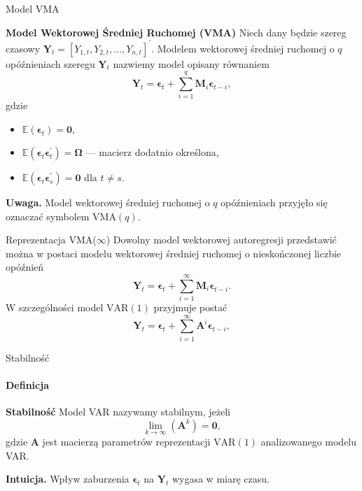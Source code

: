 \documentclass[a4paper, 11pt]{beamer}
\begin{document}
	\begin{frame}{Model VMA}
		\begin{block}{\textbf{Model Wektorowej Średniej Ruchomej (VMA)}}
			Niech dany będzie szereg czasowy $\boldsymbol{Y}_{t} = 
			\left[Y_{1,t}, Y_{2,t}, \ldots, Y_{n,t}\right]^{\prime}.$ 
			Modelem wektorowej średniej ruchomej o $q$ opóźnieniach szeregu 
			$\boldsymbol{Y}_{t}$ nazwiemy model opisany równaniem
			\[
				\boldsymbol{Y}_{t} =
					\boldsymbol{\epsilon}_{t} + 
					\sum_{i=1}^{q}
						\boldsymbol{M}_{i} \boldsymbol{\epsilon}_{t-i},
			\]
			gdzie
			\begin{itemize}
				\item $\mathbb{E}\left(\boldsymbol{\epsilon}_{t}\right) = 
					\boldsymbol{0},$
				\item $\mathbb{E}\left(
					\boldsymbol{\epsilon}_{t}
					\boldsymbol{\epsilon}_{t}^{\prime}
				\right) = \boldsymbol{\Omega}$ --- macierz dodatnio 
				określona,
				\item $\mathbb{E}\left(
					\boldsymbol{\epsilon}_{t}
					\boldsymbol{\epsilon}_{s}^{\prime}
				\right) = \boldsymbol{0}$ dla $t \neq s.$
			\end{itemize}
		\end{block}
		\begin{alert}{\textbf{Uwaga.}}
			Model wektorowej średniej ruchomej o $q$ opóźnieniach
			przyjęło się oznaczać symbolem $\mbox{VMA}\left(q\right).$
		\end{alert}
	\end{frame}
	
	\begin{frame}{Reprezentacja VMA($\infty$)}
		Dowolny model wektorowej autoregresji przedstawić można w postaci
		modelu wektorowej średniej ruchomej o nieskończonej liczbie
		opóźnień \[
			\boldsymbol{Y}_{t} =
				\boldsymbol{\epsilon}_{t} + 
				\sum_{i=1}^{\infty}
					\boldsymbol{M}_{i} \boldsymbol{\epsilon}_{t-i}.
		\]
		W szczególności model $\mbox{VAR}\left(1\right)$ przyjmuje postać \[
			\boldsymbol{Y}_{t} =
				\boldsymbol{\epsilon}_{t} + 
				\sum_{i=1}^{\infty}
					\boldsymbol{A}^{i} \boldsymbol{\epsilon}_{t-i},
		\]
	\end{frame}
	
	\begin{frame}{Stabilność}
		\framesubtitle{Definicja}
		\begin{block}{\textbf{Stabilność}}
			Model VAR nazywamy stabilnym, jeżeli \[
				\lim_{k\rightarrow\infty}\left(\boldsymbol{A}^k\right) = 
					\boldsymbol{0},
			\] gdzie $\boldsymbol{A}$ jest macierzą parametrów reprezentacji
			$\mbox{VAR}\left(1\right)$ analizowanego modelu VAR.
		\end{block}
		\begin{alert}{\textbf{Intuicja.}}
			Wpływ zaburzenia $\boldsymbol{\epsilon}_t$ na
			$\boldsymbol{Y}_t$ wygasa w miarę czasu.
		\end{alert}
	\end{frame}
	
\end{document}
